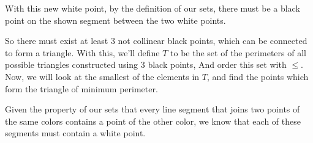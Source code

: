 \documentclass[12pt]{article}
\begin{document}
With this new white point, by the definition of our sets, there must be a black point on the shown segment between the two white points.

\begin{center}
\end{center}

So there must exist at least 3 not collinear black points, which can be connected to form a triangle. With this, we'll define $T$ to be the set of the perimeters of all possible triangles constructed using 3 black points, And order this set with $\leq$. Now, we will look at the smallest of the elements in $T$, and find the points which form the triangle of minimum perimeter.

\begin{center}
\end{center}

Given the property of our sets that every line segment that joins two points of the same colors contains a point of the other color, we know that each of these segments must contain a white point.
\end{document}
